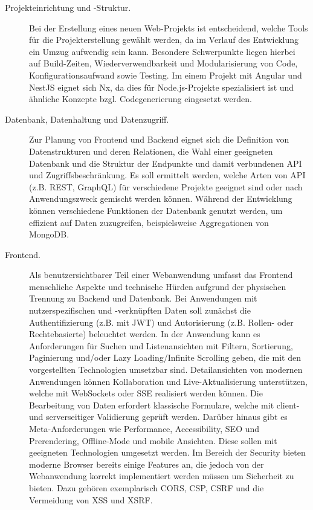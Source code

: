 \begin{description}
    \item[Projekteinrichtung und -Struktur.] Bei der Erstellung eines neuen Web-Projekts ist entscheidend, welche Tools für die Projekterstellung gewählt werden, da im Verlauf des Entwicklung ein Umzug aufwendig sein kann.
    Besondere Schwerpunkte liegen hierbei auf Build-Zeiten, Wiederverwendbarkeit und Modularisierung von Code, Konfigurationsaufwand sowie Testing.
    Im einem Projekt mit Angular und NestJS eignet sich Nx, da dies für Node.js-Projekte spezialisiert ist und ähnliche Konzepte bzgl. Codegenerierung eingesetzt werden.
    \item[Datenbank, Datenhaltung und Datenzugriff.] Zur Planung von Frontend und Backend eignet sich die Definition von Datenstrukturen und deren Relationen, die Wahl einer geeigneten Datenbank und die Struktur der Endpunkte und damit verbundenen API und Zugriffsbeschränkung.
    Es soll ermittelt werden, welche Arten von API (z.B. REST, GraphQL) für verschiedene Projekte geeignet sind oder nach Anwendungszweck gemischt werden können.
    Während der Entwicklung können verschiedene Funktionen der Datenbank genutzt werden, um effizient auf Daten zuzugreifen, beispielsweise Aggregationen von MongoDB.
    \item[Frontend.] Als benutzersichtbarer Teil einer Webanwendung umfasst das Frontend menschliche Aspekte und technische Hürden aufgrund der physischen Trennung zu Backend und Datenbank.
    Bei Anwendungen mit nutzerspezifischen und -verknüpften Daten soll zunächst die Authentifizierung (z.B. mit JWT) und Autorisierung (z.B. Rollen- oder Rechtebasierte) beleuchtet werden.
    In der Anwendung kann es Anforderungen für Suchen und Listenansichten mit Filtern, Sortierung, Paginierung und/oder Lazy Loading/Infinite Scrolling geben, die mit den vorgestellten Technologien umsetzbar sind.
    Detailansichten von modernen Anwendungen können Kollaboration und Live-Aktualisierung unterstützen, welche mit WebSockets oder SSE realisiert werden können.
    Die Bearbeitung von Daten erfordert klassische Formulare, welche mit client- und serverseitiger Validierung geprüft werden.
    Darüber hinaus gibt es Meta-Anforderungen wie Performance, Accessibility, SEO und Prerendering, Offline-Mode und mobile Ansichten.
    Diese sollen mit geeigneten Technologien umgesetzt werden.
    Im Bereich der Security bieten moderne Browser bereits einige Features an, die jedoch von der Webanwendung korrekt implementiert werden müssen um Sicherheit zu bieten.
    Dazu gehören exemplarisch CORS, CSP, CSRF und die Vermeidung von XSS und XSRF.

\end{description}
